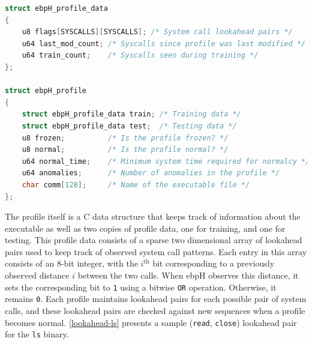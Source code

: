 \documentclass[
  12pt]{findlay}
\newcommand{\passthrough}[1]{#1}
\begin{document}
\begin{lstlisting}[language=c, label={ebph-profile-struct}, caption={A simplified
definition of the ebpH profile struct.}]
struct ebpH_profile_data
{
    u8 flags[SYSCALLS][SYSCALLS]; /* System call lookahead pairs */
    u64 last_mod_count; /* Syscalls since profile was last modified */
    u64 train_count;    /* Syscalls seen during training */
};

struct ebpH_profile
{
    struct ebpH_profile_data train; /* Training data */
    struct ebpH_profile_data test;  /* Testing data */
    u8 frozen;          /* Is the profile frozen? */
    u8 normal;          /* Is the profile normal? */
    u64 normal_time;    /* Minimum system time required for normalcy */
    u64 anomalies;      /* Number of anomalies in the profile */
    char comm[128];     /* Name of the executable file */
};
\end{lstlisting}

The profile itself is a C data structure that keeps track of information
about the executable as well as two copies of profile data, one for
training, and one for testing. This profile data consists of a sparse
two dimensional array of lookahead pairs \autocite{soma02,soma07} used
to keep track of observed system call patterns. Each entry in this array
consists of an 8-bit integer, with the \(i^\text{th}\) bit corresponding
to a previously observed distance \(i\) between the two calls. When ebpH
observes this distance, it sets the corresponding bit to
\passthrough{\lstinline!1!} using a bitwise \passthrough{\lstinline!OR!}
operation. Otherwise, it remains \passthrough{\lstinline!0!}. Each
profile maintains lookahead pairs for each possible pair of system
calls, and these lookahead pairs are checked against new sequences when
a profile becomes normal. \autoref{lookahead-ls} presents a sample
(\passthrough{\lstinline!read!}, \passthrough{\lstinline!close!})
lookahead pair for the \passthrough{\lstinline!ls!} binary.

\FloatBarrier
\end{document}
